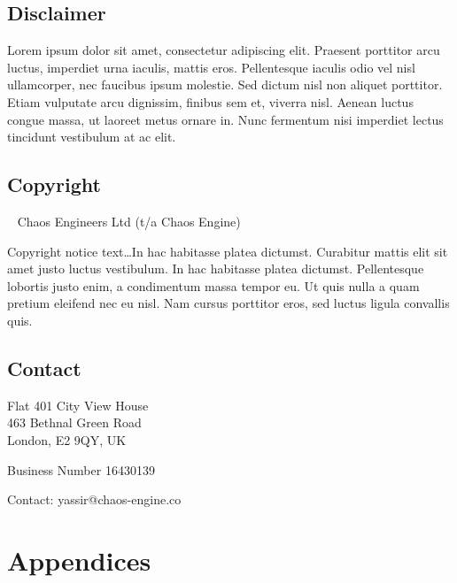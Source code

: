 \documentclass[
	a4paper, %
]{ChaosEngineReport}
\begin{document}
\vfill %

\begingroup
	\footnotesize %
	
	\subsection*{Disclaimer}

	Lorem ipsum dolor sit amet, consectetur adipiscing elit. Praesent porttitor arcu luctus, imperdiet urna iaculis, mattis eros. Pellentesque iaculis odio vel nisl ullamcorper, nec faucibus ipsum molestie. Sed dictum nisl non aliquet porttitor. Etiam vulputate arcu dignissim, finibus sem et, viverra nisl. Aenean luctus congue massa, ut laoreet metus ornare in. Nunc fermentum nisi imperdiet lectus tincidunt vestibulum at ac elit.
	
	\subsection*{Copyright}
	
	\textcopyright~\the\year{} Chaos Engineers Ltd (t/a Chaos Engine) 
	
	Copyright notice text\ldots In hac habitasse platea dictumst. Curabitur mattis elit sit amet justo luctus vestibulum. In hac habitasse platea dictumst. Pellentesque lobortis justo enim, a condimentum massa tempor eu. Ut quis nulla a quam pretium eleifend nec eu nisl. Nam cursus porttitor eros, sed luctus ligula convallis quis.
	
	\subsection*{Contact}
	
	Flat 401 City View House\\
	463 Bethnal Green Road\\
	London, E2 9QY, UK
	
	Business Number 16430139
	
	Contact: yassir@chaos-engine.co
\endgroup

\newpage

\section*{Appendices}
\end{document}

